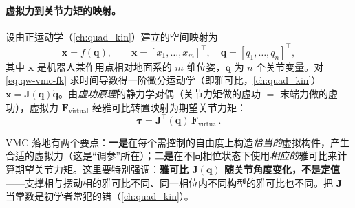 \paragraph{虚拟力到关节力矩的映射。}
设由正运动学（\cref{ch:quad_kin}）建立的空间映射为
\begin{equation}
  \boldsymbol{x}=f(\boldsymbol{q}),\qquad
  \boldsymbol{x}=[x_1,\dots,x_m]^\top,\quad
  \boldsymbol{q}=[q_1,\dots,q_n]^\top,
  \label{eq:qw-vmc-fk}
\end{equation}
其中 $\boldsymbol{x}$ 是机器人某作用点相对地面系的 $m$ 维位姿，$\boldsymbol{q}$ 为 $n$ 个关节变量。对 \cref{eq:qw-vmc-fk} 求时间导数得一阶微分运动学（即雅可比，\cref{ch:quad_kin}）$\dot{\boldsymbol{x}}=\boldsymbol{J}(\boldsymbol{q})\dot{\boldsymbol{q}}$。由\emph{虚功原理}的静力学对偶（关节力矩做的虚功 $=$ 末端力做的虚功），虚拟力 $\boldsymbol{F}_{\mathrm{virtual}}$ 经雅可比转置映射为期望关节力矩\cite{yu2021quadruped}：
\begin{equation}
  \boldsymbol{\tau}=\boldsymbol{J}^\top(\boldsymbol{q})\,\boldsymbol{F}_{\mathrm{virtual}}.
  \label{eq:qw-vmc-jt}
\end{equation}

\begin{insight}\label{ins:qw-vmc-keys}
VMC 落地有两个要点：\textbf{一是}在每个需控制的自由度上构造\emph{恰当的}虚拟构件，产生合适的虚拟力（这是“调参”所在）；\textbf{二是}在不同相位状态下使用\emph{相应的}雅可比来计算期望关节力矩。这里要特别强调：\textbf{雅可比 $\boldsymbol{J}(\boldsymbol{q})$ 随关节角度变化，不是定值}——支撑相与摆动相的雅可比不同、同一相位内不同构型的雅可比也不同。把 $\boldsymbol{J}$ 当常数是初学者常犯的错（\cref{ch:quad_kin}）。
\end{insight}

